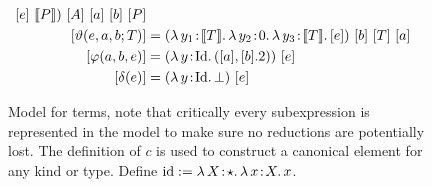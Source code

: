 \begin{figure}
\begin{align*}
{{{                        [e]\ \sema{P}
                    }
                }
            })\ [A]\ [a]\ [b]\ [P] \\
        [\vartheta(e, a, b; T)] &= (\abs{\lambda}{y_1}{\sema{T}}{
            \abs{\lambda}{y_2}{0} {
                \abs{\lambda}{y_3}{\sema{T}}{
                    [e]
                }
            }
        })\ [b]\ [T]\ [a] \\
        [\varphi(a, b, e)] &= (\abs{\lambda}{y}{\fpId}{
            ([a], [b].2)
        })\ [e] \\
        [\delta(e)] &= (\abs{\lambda}{y}{\fpId}{
            \bot
        })\ [e]
    \end{align*}
    \caption{
        Model for terms, note that critically every subexpression is represented in the model to make sure no reductions are potentially lost.
        The definition of $c$ is used to construct a canonical element for any kind or type.
        Define $\textnormal{id} := {\lambda}\, X\! : \! \star.\, 
            {\lambda}\, x\! : \! X.\, x
       $.
    }
    \label{fig:3:model_terms}
\end{figure}
